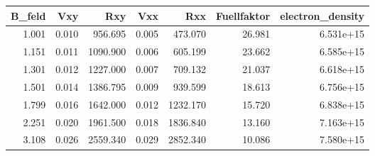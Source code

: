 \begin{tabular}{rrrrrrr}
\toprule
 B\_feld &    Vxy &       Rxy &    Vxx &       Rxx &  Fuellfaktor &  electron\_density \\
\midrule
  1.001 &  0.010 &   956.695 &  0.005 &   473.070 &       26.981 &         6.531e+15 \\
  1.151 &  0.011 &  1090.900 &  0.006 &   605.199 &       23.662 &         6.585e+15 \\
  1.301 &  0.012 &  1227.000 &  0.007 &   709.132 &       21.037 &         6.618e+15 \\
  1.501 &  0.014 &  1386.795 &  0.009 &   939.599 &       18.613 &         6.756e+15 \\
  1.799 &  0.016 &  1642.000 &  0.012 &  1232.170 &       15.720 &         6.838e+15 \\
  2.251 &  0.020 &  1961.500 &  0.018 &  1836.840 &       13.160 &         7.163e+15 \\
  3.108 &  0.026 &  2559.340 &  0.029 &  2852.340 &       10.086 &         7.580e+15 \\
\bottomrule
\end{tabular}
